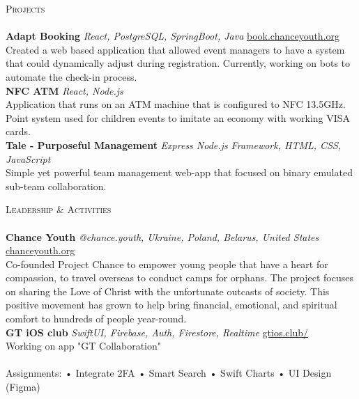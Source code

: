 \documentclass[a4paper]{article}
\newcommand{\lineunder} {
    \vspace*{-8pt} \\
    \hspace*{-18pt} \hrulefill \\
}
\newcommand{\header} [1] {
    {\hspace*{-18pt}\vspace*{6pt} \textsc{#1}}
    \vspace*{-6pt} \lineunder
}
\begin{document}
\header{Projects}
{\textbf{Adapt Booking}} {\sl React, PostgreSQL, SpringBoot, Java} \hfill \href{https://book.chanceyouth.org}{book.chanceyouth.org}\\
Created a web based application that allowed event managers to have a system that could dynamically adjust during registration. Currently, working on bots to automate the check-in process.\\
\vspace*{2mm}
{\textbf{NFC ATM}} {\sl React, Node.js} \\
Application that runs on an ATM machine that is configured to NFC 13.5GHz. Point system used for children events to imitate an economy with working VISA cards.\\
\vspace*{2mm}
{\textbf{Tale - Purposeful Management}} {\sl Express Node.js Framework, HTML, CSS, JavaScript} \\
Simple yet powerful team management web-app that focused on binary emulated sub-team collaboration.\\
\vspace*{2mm}
\header{Leadership \& Activities}
\vspace*{2mm}
{\textbf{Chance Youth}} {\sl @chance.youth, Ukraine, Poland, Belarus, United States} \hfill \href{https://chanceyouth.org}{chanceyouth.org}\\
Co-founded Project Chance to empower young people that have a heart for compassion, to travel overseas to conduct camps for orphans. The project focuses on sharing the Love of Christ with the unfortunate outcasts of society. This positive movement has grown to help bring financial, emotional, and spiritual comfort to hundreds of people year-round.\\
\vspace*{2mm}
{\textbf{GT iOS club}} {\sl SwiftUI, Firebase, Auth, Firestore, Realtime} \hfill \href{https://gtios.club/}{gtios.club/}\\
Working on app "GT Collaboration" \\
\\ Assignments: • Integrate 2FA • Smart Search • Swift Charts • UI Design (Figma)
\vspace*{2mm}
\ 
\end{document}
